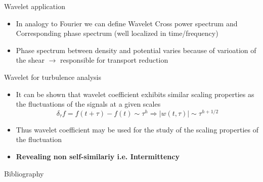 \documentclass[t,10pt]{beamer}
\begin{document}
\begin{frame}{Wavelet application}
\begin{itemize}
\item In analogy to Fourier we can define Wavelet Cross power spectrum
  and Corresponding phase spectrum (well localized in time/frequency)


\item Phase spectrum between density and potential varies because of
  varioation of the shear $\rightarrow$ responsible for transport
  reduction {\footnotesize\parencite{Antoni:2000bn}}

\end{itemize}
\end{frame}


\begin{frame}{Wavelet for turbulence analysis}
 \begin{itemize}[<+->]
  \item It can be shown that wavelet coefficient exhibits similar
    scaling properties as the fluctuations of the signals at a given
    scales
\begin{equation*}
\delta_{\tau} f = f(t+\tau)-f(t) \sim \tau^h \Rightarrow |w(t,\tau)|\sim\tau^{h+1/2}
\end{equation*}
\item Thus wavelet coefficient may be used for the study of the
  scaling properties of the fluctuation

\item \textcolor{tascarletred}{\textbf{Revealing non
      self-similariy i.e. Intermittency}}


\end{itemize}
\end{frame}


\begin{frame}{Bibliography}
\printbibliography
\end{frame}
\end{document}
